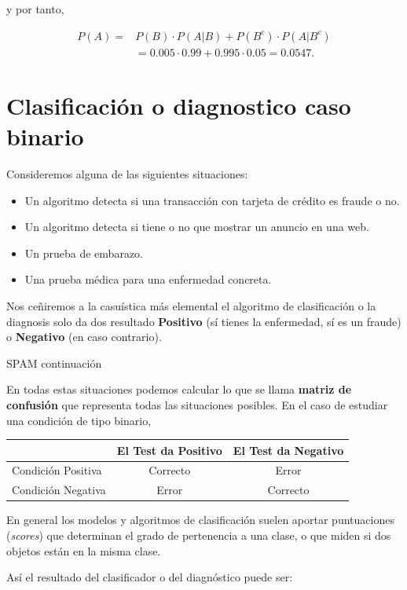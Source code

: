 \documentclass[
  letterpaper,
  DIV=11,
  numbers=noendperiod]{scrreprt}
\providecommand{\tightlist}{%
  \setlength{\itemsep}{0pt}\setlength{\parskip}{0pt}}\usepackage{longtable,booktabs,array}
\begin{document}
y por tanto,

\[
\begin{array}{rl}
P(A)=& P(B)\cdot P(A|B)+P(B^c)\cdot P(A|B^c)\\
& =0.005\cdot 0.99+0.995\cdot 0.05=0.0547.
\end{array}
\]

\section{Clasificación o diagnostico caso
binario}\label{clasificaciuxf3n-o-diagnostico-caso-binario}

Consideremos alguna de las siguientes situaciones:

\begin{itemize}
\tightlist
\item
  Un algoritmo detecta si una transacción con tarjeta de crédito es
  fraude o no.
\item
  Un algoritmo detecta si tiene o no que mostrar un anuncio en una web.
\item
  Un prueba de embarazo.
\item
  Una prueba médica para una enfermedad concreta.
\end{itemize}

Nos ceñiremos a la casuística más elemental el algoritmo de
clasificación o la diagnosis solo da dos resultado \textbf{Positivo} (sí
tienes la enfermedad, sí es un fraude) o \textbf{Negativo} (en caso
contrario).

SPAM continuación

En todas estas situaciones podemos calcular lo que se llama
\textbf{matriz de confusión} que representa todas las situaciones
posibles. En el caso de estudiar una condición de tipo binario,

\begin{longtable}[]{@{}lcc@{}}
\toprule\noalign{}
& El Test da Positivo & El Test da Negativo \\
\midrule\noalign{}
\endhead
\bottomrule\noalign{}
\endlastfoot
Condición Positiva & Correcto & Error \\
Condición Negativa & Error & Correcto \\
\end{longtable}

En general los modelos y algoritmos de clasificación suelen aportar
puntuaciones (\emph{scores}) que determinan el grado de pertenencia a
una clase, o que miden si dos objetos están en la misma clase.

Así el resultado del clasificador o del diagnóstico puede ser:
\end{document}
